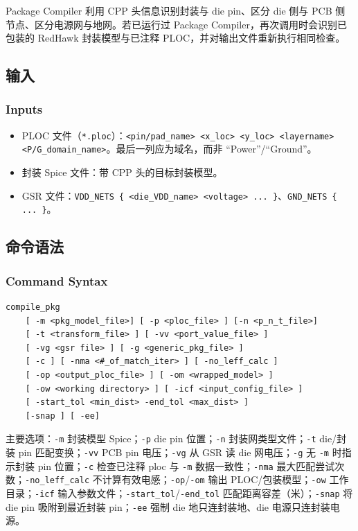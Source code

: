 Package Compiler 利用 CPP 头信息识别封装与 die pin、区分 die 侧与 PCB 侧节点、区分电源网与地网。若已运行过 Package Compiler，再次调用时会识别已包装的 RedHawk 封装模型与已注释 PLOC，并对输出文件重新执行相同检查。


\subsection{输入}
\subsubsection*{Inputs}
\begin{itemize}
  \item PLOC 文件（\texttt{*.ploc}）：\texttt{<pin/pad\_name> <x\_loc> <y\_loc> <layername> <P/G\_domain\_name>}。最后一列应为域名，而非 ``Power''/``Ground''。
  \item 封装 Spice 文件：带 CPP 头的目标封装模型。
  \item GSR 文件：\texttt{VDD\_NETS \{ <die\_VDD\_name> <voltage> ... \}}、\texttt{GND\_NETS \{ ... \}}。
\end{itemize}

\subsection{命令语法}
\subsubsection*{Command Syntax}
\begin{lstlisting}
compile_pkg
    [ -m <pkg_model_file>] [ -p <ploc_file> ] [-n <p_n_t_file>]
    [ -t <transform_file> ] [ -vv <port_value_file> ]
    [ -vg <gsr file> ] [ -g <generic_pkg_file> ]
    [ -c ] [ -nma <#_of_match_iter> ] [ -no_leff_calc ]
    [ -op <output_ploc_file> ] [ -om <wrapped_model> ]
    [ -ow <working directory> ] [ -icf <input_config_file> ]
    [ -start_tol <min_dist> -end_tol <max_dist> ]
    [-snap ] [ -ee]
\end{lstlisting}

主要选项：\texttt{-m} 封装模型 Spice；\texttt{-p} die pin 位置；\texttt{-n} 封装网类型文件；\texttt{-t} die/封装 pin 匹配变换；\texttt{-vv} PCB pin 电压；\texttt{-vg} 从 GSR 读 die 网电压；\texttt{-g} 无 \texttt{-m} 时指示封装 pin 位置；\texttt{-c} 检查已注释 ploc 与 \texttt{-m} 数据一致性；\texttt{-nma} 最大匹配尝试次数；\texttt{-no\_leff\_calc} 不计算有效电感；\texttt{-op}/\texttt{-om} 输出 PLOC/包装模型；\texttt{-ow} 工作目录；\texttt{-icf} 输入参数文件；\texttt{-start\_tol}/\texttt{-end\_tol} 匹配距离容差（米）；\texttt{-snap} 将 die pin 吸附到最近封装 pin；\texttt{-ee} 强制 die 地只连封装地、die 电源只连封装电源。

